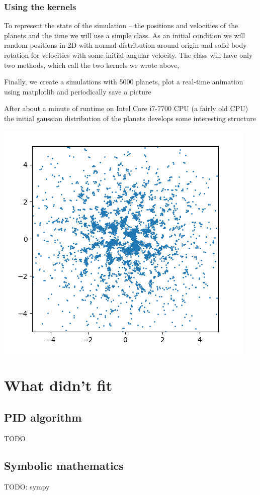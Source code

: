\documentclass{article}
\begin{document}
\subsubsection{Using the kernels}
To represent the state of the simulation -- the positions and velocities of the planets and the time we will use a simple class. As an initial condition we will random positions in 2D with normal distribution around origin and solid body rotation for velocities with some initial angular velocity. The class will have only two methods, which call the two kernels we wrote above,


Finally, we create a simulations with 5000 planets, plot a real-time animation using matplotlib and periodically save a picture


After about a minute of runtime on Intel Core i7-7700 CPU (a fairly old CPU) the initial gaussian distribution of the planets develops some interesting structure
\begin{center}
    \includegraphics[width=0.5\linewidth]{gravity.png}
\end{center}

\newpage
\section{What didn't fit}

\subsection{PID algorithm}
TODO

\subsection{Symbolic mathematics}
TODO: sympy
\end{document}
